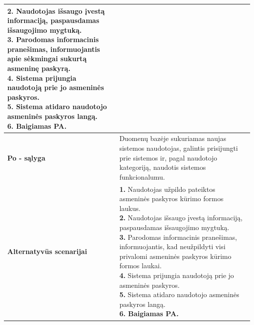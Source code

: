 \documentclass[12pt]{article}
\begin{document}
\begin{table}[htb!]
\begin{tabular}{|m{3cm}|m{13.7cm}|}
{{            \textbf{2.} \textcolor{dartmouthgreen}{Naudotojas išsaugo įvestą
            informaciją, paspausdamas išsaugojimo mygtuką.} \\
            \textbf{3.} {Parodomas informacinis
            pranešimas, informuojantis apie sėkmingai sukurtą asmeninę
            paskyrą.} \\
            \textbf{4.} {Sistema prijungia naudotoją
            prie jo asmeninės paskyros.} \\
            \textbf{5.} {Sistema atidaro naudotojo
            asmeninės paskyros langą.} \\
            \textbf{6. Baigiamas PA.}
        }}
        \\
        \hline
        \raggedleft \textbf{\cellcolor{deepchampagne}Po - sąlyga} &
        Duomenų bazėje sukuriamas naujas sistemos naudotojas, galintis
        prisijungti prie sistemos ir, pagal naudotojo kategoriją, naudotis
        sistemos funkcionalumu. \\
        \hline
        \raggedleft \textbf{\cellcolor{deepchampagne}Alternatyvūs scenarijai} &
        \vskip 5pt
        \makecell[l]{\parbox[t]{13.7cm}{
            \textbf{1.} \textcolor{dartmouthgreen}{Naudotojas užpildo pateiktos
            asmeninės paskyros kūrimo formos laukus.} \\
            \textbf{2.} \textcolor{dartmouthgreen}{Naudotojas išsaugo įvestą
            informaciją, paspausdamas išsaugojimo mygtuką.} \\
            \textbf{3.} Parodomas informacinis pranešimas, informuojantis, kad
            neužpildyti visi privalomi asmeninės paskyros kūrimo formos
            laukai. \\
            \textbf{4.} {Sistema prijungia naudotoją prie jo asmeninės
            paskyros.} \\
            \textbf{5.} {Sistema atidaro naudotojo asmeninės paskyros langą.} \\
            \textbf{6. Baigiamas PA.}
        }}
        \\
        \hline
    \end{tabular}
\end{table}

\newpage
\end{document}

